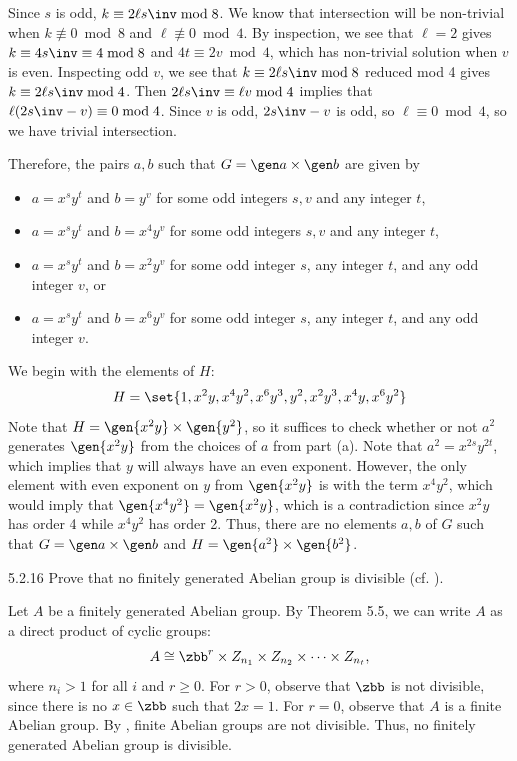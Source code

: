 \begin{solenum}[spsol]
\begin{enumerate}[label=(\arabic*)]
	Since $s$ is odd, $k \equiv 2 \ell s\inv \bmod 8$.
	We know that intersection will be non-trivial when $k \not\equiv 0 \bmod 8$ and $\ell \not\equiv 0 \bmod 4$.
	By inspection, we see that $\ell = 2$ gives $k \equiv 4s\inv \equiv 4 \bmod 8$ and $4t \equiv 2v \bmod 4$, which has non-trivial solution when $v$ is even.
	Inspecting odd $v$, we see that $k \equiv 2\ell s\inv \bmod 8$ reduced mod 4 gives $k \equiv 2 \ell s\inv \bmod 4$.
	Then $2 \ell s\inv \equiv \ell v \bmod 4$ implies that $\ell(2s\inv - v) \equiv 0 \bmod 4$.
	Since $v$ is odd, $2s\inv - v$ is odd, so $\ell \equiv 0 \bmod 4$, so we have trivial intersection.
    \end{enumerate}
    Therefore, the pairs $a, b$ such that $G = \gen a \times \gen b$ are given by
    \begin{itemize}
        \item $a = x^s y^t$ and $b = y^v$ for some odd integers $s, v$ and any integer $t$,
        \item $a = x^s y^t$ and $b = x^4 y^v$ for some odd integers $s, v$ and any integer $t$,
        \item $a = x^s y^t$ and $b = x^2 y^v$ for some odd integer $s$, any integer $t$, and any odd integer $v$, or
        \item $a = x^s y^t$ and $b = x^6 y^v$ for some odd integer $s$, any integer $t$, and any odd integer $v$.
    \end{itemize}
    \item We begin with the elements of $H$:
    \[
    	H = \set{1, x^2y, x^4y^2, x^6y^3, y^2, x^2y^3, x^4y, x^6y^2}
    \]
    Note that $H = \gen{x^2y} \times \gen{y^2}$, so it suffices to check whether or not $a^2$ generates $\gen{x^2y}$ from the choices of $a$ from part (a).
	Note that $a^2 = x^{2s} y^{2t}$, which implies that $y$ will always have an even exponent.
	However, the only element with even exponent on $y$ from $\gen{x^2y}$ is with the term $x^4y^2$, which would imply that $\gen{x^4y^2} = \gen{x^2y}$, which is a contradiction since $x^2y$ has order 4 while $x^4y^2$ has order 2.
	Thus, there are no elements $a, b$ of $G$ such that $G = \gen a \times \gen b$ and $H = \gen{a^2} \times \gen{b^2}$.
\end{solenum}

\begin{exercise}{5.2.16}
    Prove that no finitely generated Abelian group is divisible (cf. ).
\end{exercise}

\begin{sol}
    Let $A$ be a finitely generated Abelian group.
	By Theorem 5.5, we can write $A$ as a direct product of cyclic groups:
    \[
    	A \cong \zbb^r \times Z_{n_1} \times Z_{n_2} \times \cdots \times Z_{n_t},
    \]
    where $n_i > 1$ for all $i$ and $r \geq 0$.
	For $r > 0$, observe that $\zbb$ is not divisible, since there is no $x \in \zbb$ such that $2x = 1$.
	For $r = 0$, observe that $A$ is a finite Abelian group.
	By , finite Abelian groups are not divisible.
	Thus, no finitely generated Abelian group is divisible.
\end{sol}